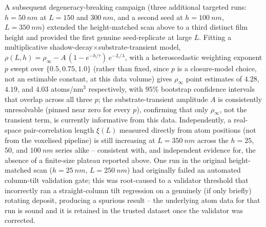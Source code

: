 \documentclass[aip,amsmath,amssymb,reprint]{revtex4-1}
\begin{document}
A subsequent degeneracy-breaking campaign (three additional targeted runs:
$h=\SI{50}{nm}$ at $L=150$ and $\SI{300}{nm}$, and a second seed at
$h=\SI{100}{nm}$, $L=\SI{350}{nm}$) extended the height-matched scan above
to a third distinct film height and provided the first genuine
seed-replicate at large $L$. Fitting a multiplicative
shadow-decay$\times$substrate-transient model, $\rho(L,h) = \rho_\infty -
A\,(1-e^{-h/\tau})\,e^{-L/\lambda}$, with a heteroscedastic weighting
exponent $p$ swept over $\{0.5,0.75,1.0\}$ (rather than fixed, since $p$ is
a closure-model choice, not an estimable constant, at this data volume)
gives $\rho_\infty$ point estimates of $4.28$, $4.19$, and $4.03$
atoms/nm$^3$ respectively, with $95\%$ bootstrap confidence intervals that
overlap across all three $p$; the substrate-transient amplitude $A$ is
consistently unresolvable (pinned near zero for every $p$), confirming
that only $\rho_\infty$, not the transient term, is currently informative
from this data. Independently, a real-space pair-correlation length
$\xi(L)$ measured directly from atom positions (not from the voxelised
pipeline) is still increasing at $L=\SI{350}{nm}$ across the $h=25$, $50$,
and $\SI{100}{nm}$ series alike -- consistent with, and independent
evidence for, the absence of a finite-size plateau reported above. One run
in the original height-matched scan ($h=\SI{25}{nm}$, $L=\SI{250}{nm}$) had
originally failed an automated column-tilt validation gate; this was
root-caused to a validator threshold that incorrectly ran a straight-column
tilt regression on a genuinely (if only briefly) rotating deposit, producing
a spurious result -- the underlying atom data for that run is sound and it
is retained in the trusted dataset once the validator was corrected.
\end{document}
